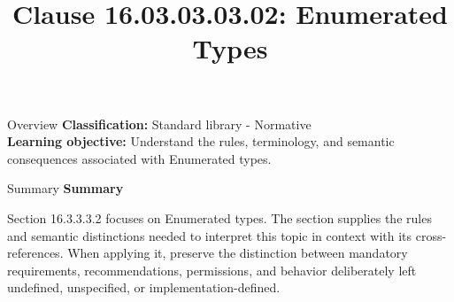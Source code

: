 \documentclass[10pt,letterpaper]{article}
\title{Clause 16.03.03.03.02: Enumerated Types}
\author{}
\date{}
\begin{document}
\maketitle
\begin{CornellOverviewBox}{Overview}
\textbf{Classification:} Standard library - Normative\\[2pt]
\textbf{Learning objective:} Understand the rules, terminology, and semantic consequences associated with Enumerated types.
\end{CornellOverviewBox}\begin{CornellSummaryBox}{Summary}
{\sffamily\bfseries\color{Accent} Summary}\par\vspace{3pt}Section 16.3.3.3.2 focuses on Enumerated types. The section supplies the rules and semantic distinctions needed to interpret this topic in context with its cross-references. When applying it, preserve the distinction between mandatory requirements, recommendations, permissions, and behavior deliberately left undefined, unspecified, or implementation-defined.
\end{CornellSummaryBox}
\end{document}
